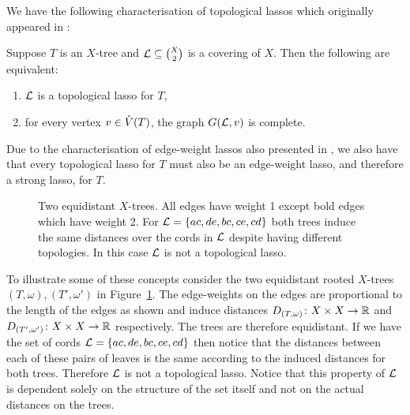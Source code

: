 We have the following characterisation of topological lassos which originally
appeared in \cite{HP13}:
\begin{lem}
  \label{lem:child-edge-graph-complete}
  Suppose $T$ is an $X$-tree and ${\mathcal L} \subseteq {X \choose 2}$ is a covering
  of $X$.  Then the following are equivalent:
  \begin{enumerate}
  \item ${\mathcal L}$ is a topological lasso for $T$,
  \item for every vertex $v \in \mathring{V}(T)$, the graph $G({\mathcal L},v)$ is complete.
  \end{enumerate}
\end{lem}

Due to the characterisation of edge-weight lassos also presented in
\cite{HP13}, we also have that every topological lasso for $T$ must also be an
edge-weight lasso, and therefore a strong lasso, for $T$.

\begin{figure}
\begin{center}

\end{center}
\caption{Two equidistant $X$-trees.  All edges have weight 1 except bold edges
  which have weight 2.  For ${\mathcal L}=\{ac,de,bc,ce,cd\}$ both trees induce the
  same distances over the cords in ${\mathcal L}$ despite having different topologies.
  In this case ${\mathcal L}$ is not a topological lasso.}
\label{fig:lasso-example}
\end{figure}

To illustrate some of these concepts consider the two equidistant rooted
$X$-trees $(T,\omega),(T',\omega')$ in Figure~\ref{fig:lasso-example}.  The
edge-weights on the edges are proportional to the length of the edges as shown
and induce distances $D_{(T,\omega)} \colon X \times X \to {\mathbb R}$ and
$D_{(T',\omega')} \colon X \times X \to {\mathbb R}$ respectively.  The trees are
therefore equidistant.  If we have the set of cords ${\mathcal L}=\{ac,de,bc,ce,cd\}$
then notice that the distances between each of these pairs of leaves is the
same according to the induced distances for both trees.  Therefore ${\mathcal L}$ is
not a topological lasso.  Notice that this property of ${\mathcal L}$ is dependent
solely on the structure of the set itself and not on the actual distances on
the trees.

